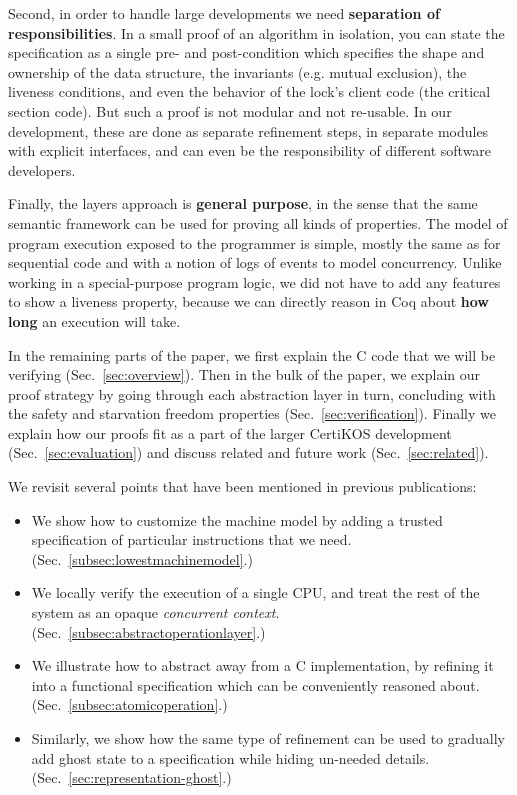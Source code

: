 Second, in order to handle large developments we need {\bf separation of responsibilities}. In a small proof of an algorithm in isolation, you can state the specification as a single pre- and post-condition which specifies the shape and ownership of the data structure, the invariants (e.g. mutual exclusion), the liveness conditions, and even the behavior of the lock's client code (the critical section code). But such a proof is not modular and not re-usable. In our development, these are done as separate refinement steps, in separate modules with explicit interfaces, and can even be the responsibility of different software developers. 

Finally, the layers approach is {\bf general purpose}, in the sense
that the same semantic framework can be used for proving all kinds of
properties. The model of program execution exposed to the programmer
is simple, mostly the same as for sequential code and with a notion of logs of events to model concurrency.
Unlike working in a special-purpose program logic, we 
did not have to add any features to show a liveness property, because we can directly reason in Coq about \textbf{how long} an execution will take. 

In the remaining parts of the paper, we first explain the C code that we will be verifying (Sec.~\ref{sec:overview}).
Then in the bulk of the paper, we explain our proof strategy by going through each abstraction layer in turn, concluding with the safety and starvation freedom properties (Sec.~\ref{sec:verification}). Finally we explain how our proofs fit as a part of the larger CertiKOS development (Sec.~\ref{sec:evaluation}) and discuss related and future work (Sec.~\ref{sec:related}).

We revisit several points that have been mentioned in previous publications:

\begin{itemize}
\item We show how to customize the machine model by adding a trusted specification of particular instructions that we need. (Sec.~\ref{subsec:lowestmachinemodel}.)

\item We locally verify the execution of a single CPU, and treat the rest of the system as an opaque \emph{concurrent context}. (Sec.~\ref{subsec:abstractoperationlayer}.)

\item We illustrate how to abstract away from a C implementation, by refining it into a functional specification which can be conveniently reasoned about. (Sec.~\ref{subsec:atomicoperation}.)

\item Similarly, we show how the same type of refinement can be used to gradually add ghost state to a specification while hiding un-needed details. (Sec.~\ref{sec:representation-ghost}.)

\end{itemize}

